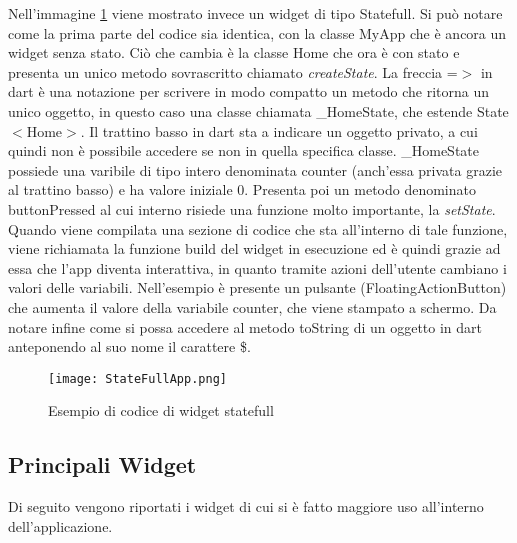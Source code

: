 	Nell'immagine \ref{statefull} viene mostrato invece un widget di tipo
	Statefull. Si può notare come la prima parte del codice sia identica, con la
	classe MyApp che è ancora un widget senza stato. Ciò che cambia è la classe
	Home che ora è con stato e presenta un unico metodo sovrascritto chiamato
	\textit{createState}. La freccia =$>$ in dart è una notazione per scrivere in
	modo compatto un metodo che ritorna un unico oggetto, in questo caso una
	classe chiamata \_HomeState, che estende State$<$Home$>$. Il trattino basso
	in dart sta a indicare un oggetto privato, a cui quindi non è possibile
	accedere se non in quella specifica classe. \_HomeState possiede una
	varibile di tipo intero denominata counter (anch'essa privata grazie al
	trattino basso) e ha valore iniziale 0. Presenta poi un metodo denominato
	buttonPressed al cui interno risiede una funzione molto importante, la
	\textit{setState}. Quando viene compilata una sezione di codice che sta
	all'interno di tale funzione, viene richiamata la funzione build del widget
	in esecuzione ed è quindi grazie ad essa che l'app diventa interattiva, in
	quanto tramite azioni dell'utente cambiano i valori delle variabili.
	Nell'esempio è presente un pulsante (FloatingActionButton) che aumenta il
	valore della variabile counter, che viene stampato a schermo. Da notare
	infine come si possa accedere al metodo toString di un oggetto in dart
	anteponendo al suo nome il carattere \$.

	\begin{figure}[h!]
		\centering
		\caption{Esempio di codice di widget statefull}{\texttt{[image: StateFullApp.png]}\label{statefull}}
	\end{figure}

	\subsection{Principali Widget}
	Di seguito vengono riportati i widget di cui si è fatto maggiore uso
	all'interno dell'applicazione.
	

